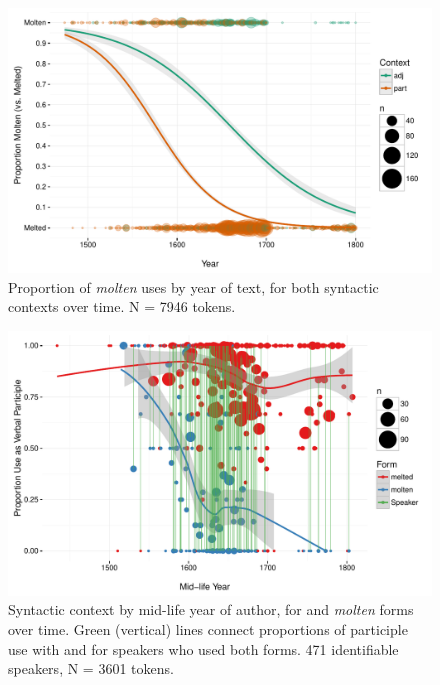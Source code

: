 \documentclass{artikel3}
\begin{document}
\begin{figure}
    \begin{center}
    \includegraphics[scale=.6]{FormByDateUnbinnedWithDots2.pdf}
    \caption{Proportion of \textsl{molten} uses by year of text, for both syntactic contexts over time. N =  7946 tokens.}
       \label{molten2}
    \end{center}
\end{figure}

\begin{figure}
    \begin{center}
    \includegraphics[scale=.6]{ContextByDateAuthor.pdf}
    \caption{Syntactic context by mid-life year of author, for  and \textsl{molten} forms over time. Green (vertical) lines connect proportions of participle use with  and  for speakers who used both forms. 471 identifiable speakers, N = 3601 tokens.}
       \label{molten3}
    \end{center}
\end{figure}
\end{document}
